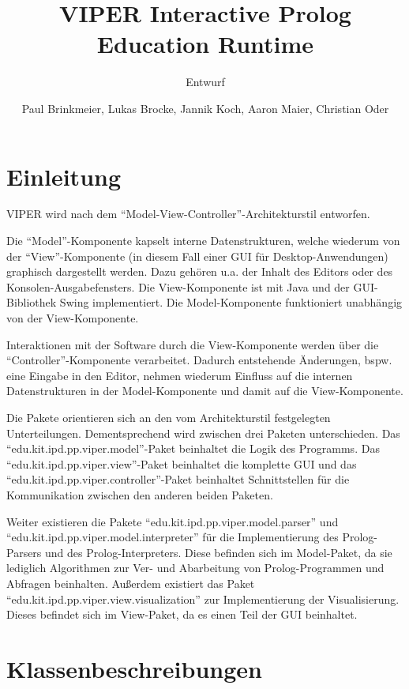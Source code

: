 \documentclass[parskip=full,11pt,twoside]{scrartcl}
\title{VIPER Interactive Prolog Education Runtime}
\subtitle{Entwurf}
\author{Paul Brinkmeier, Lukas Brocke, Jannik Koch, Aaron Maier, Christian Oder}
\begin{document}
\maketitle

\section{Einleitung}

VIPER wird nach dem \enquote{Model-View-Controller}-Architekturstil entworfen.

Die \enquote{Model}-Komponente kapselt interne Datenstrukturen, welche wiederum von der \enquote{View}-Komponente (in diesem Fall einer GUI für Desktop-Anwendungen) graphisch dargestellt werden. Dazu gehören u.a. der Inhalt des Editors oder des Konsolen-Ausgabefensters. Die View-Komponente ist mit Java und der GUI-Bibliothek Swing implementiert. Die Model-Komponente funktioniert unabhängig von der View-Komponente.

Interaktionen mit der Software durch die View-Komponente werden über die \enquote{Controller}-Komponente verarbeitet. Dadurch entstehende Änderungen, bspw. eine Eingabe in den Editor, nehmen wiederum Einfluss auf die internen Datenstrukturen in der Model-Komponente und damit auf die View-Komponente.

Die Pakete orientieren sich an den vom Architekturstil festgelegten Unterteilungen. Dementsprechend wird zwischen drei Paketen unterschieden. Das \enquote{edu.kit.ipd.pp.viper.model}-Paket beinhaltet die Logik des Programms. Das \enquote{edu.kit.ipd.pp.viper.view}-Paket beinhaltet die komplette GUI und das \enquote{edu.kit.ipd.pp.viper.controller}-Paket beinhaltet Schnittstellen für die Kommunikation zwischen den anderen beiden Paketen.

Weiter existieren die Pakete \enquote{edu.kit.ipd.pp.viper.model.parser} und \enquote{edu.kit.ipd.pp.viper.model.interpreter} für die Implementierung des Prolog-Parsers und des Prolog-Interpreters. Diese befinden sich im Model-Paket, da sie lediglich Algorithmen zur Ver- und Abarbeitung von Prolog-Programmen und Abfragen beinhalten.
Außerdem existiert das Paket \enquote{edu.kit.ipd.pp.viper.view.visualization} zur Implementierung der Visualisierung. Dieses befindet sich im View-Paket, da es einen Teil der GUI beinhaltet. 

\section{Klassenbeschreibungen}
\end{document}
